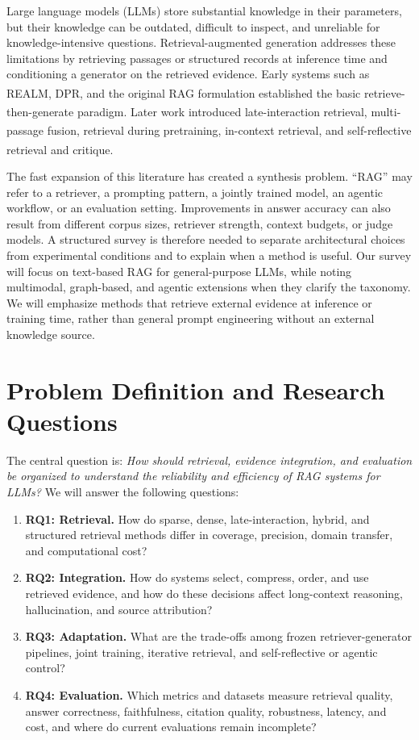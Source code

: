 \documentclass[10.5pt,compsoc]{CjC}
\newcommand{\upcite}[1]{\textsuperscript{\cite{#1}}}
\begin{document}
Large language models (LLMs) store substantial knowledge in their parameters, but their knowledge can be outdated, difficult to inspect, and unreliable for knowledge-intensive questions. Retrieval-augmented generation addresses these limitations by retrieving passages or structured records at inference time and conditioning a generator on the retrieved evidence. Early systems such as REALM\upcite{guu2020realm}, DPR\upcite{karpukhin2020dpr}, and the original RAG formulation\upcite{lewis2020rag} established the basic retrieve-then-generate paradigm. Later work introduced late-interaction retrieval\upcite{khattab2020colbert}, multi-passage fusion\upcite{izacard2021fid}, retrieval during pretraining\upcite{borgeaud2022retro}, in-context retrieval\upcite{ram2023incontext}, and self-reflective retrieval and critique\upcite{asai2024selfrag}.

The fast expansion of this literature has created a synthesis problem. ``RAG'' may refer to a retriever, a prompting pattern, a jointly trained model, an agentic workflow, or an evaluation setting. Improvements in answer accuracy can also result from different corpus sizes, retriever strength, context budgets, or judge models. A structured survey is therefore needed to separate architectural choices from experimental conditions and to explain when a method is useful. Our survey will focus on text-based RAG for general-purpose LLMs, while noting multimodal, graph-based, and agentic extensions when they clarify the taxonomy. We will emphasize methods that retrieve external evidence at inference or training time, rather than general prompt engineering without an external knowledge source.

\section{Problem Definition and Research Questions}

The central question is: \emph{How should retrieval, evidence integration, and evaluation be organized to understand the reliability and efficiency of RAG systems for LLMs?} We will answer the following questions:

\begin{enumerate}
\item \textbf{RQ1: Retrieval.} How do sparse, dense, late-interaction, hybrid, and structured retrieval methods differ in coverage, precision, domain transfer, and computational cost?
\item \textbf{RQ2: Integration.} How do systems select, compress, order, and use retrieved evidence, and how do these decisions affect long-context reasoning, hallucination, and source attribution?
\item \textbf{RQ3: Adaptation.} What are the trade-offs among frozen retriever-generator pipelines, joint training, iterative retrieval, and self-reflective or agentic control?
\item \textbf{RQ4: Evaluation.} Which metrics and datasets measure retrieval quality, answer correctness, faithfulness, citation quality, robustness, latency, and cost, and where do current evaluations remain incomplete?
\end{enumerate}
\end{document}
